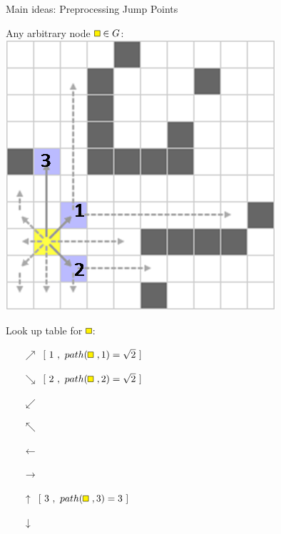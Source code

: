 \documentclass{presentation}
\begin{document}
\begin{frame}
\end{frame}



\begin{frame}{Main ideas: Preprocessing Jump Points}
	\begin{minipage}{0.45\textwidth}
		Any arbitrary node $\tikz{\path[draw=black,fill=yellow] (0,0) rectangle (2mm,2mm);}\in G$:\\
		\vspace{3mm}
		\includegraphics[width=\textwidth]{figures/jps_geschnitten/1(yellow).png}
	\end{minipage}%
	\hfill%
	\begin{minipage}{0.45\textwidth}
		Look up table for $\tikz{\path[draw=black,fill=yellow] (0,0) rectangle (2mm,2mm);}$:\\
		\vspace{3mm}
		\begin{itemize}
		\pause
		\item[$\nearrow$] $[\ 1\ ,\ path(\tikz{\path[draw=black,fill=yellow] (0,0) rectangle (2mm,2mm);}\ ,1)=\sqrt{2}\ ]$
		\pause
		\item[$\searrow$] $[\ 2\ ,\ path(\tikz{\path[draw=black,fill=yellow] (0,0) rectangle (2mm,2mm);}\ ,2)=\sqrt{2}\ ]$
		\item[$\swarrow$]
		\item[$\nwarrow$]
		\item[$\leftarrow$]
		\item[$\rightarrow$]
		\pause
		\item[$\uparrow$] $[\ 3\ ,\ path(\tikz{\path[draw=black,fill=yellow] (0,0) rectangle (2mm,2mm);}\ ,3)=3\ ]$
		\item[$\downarrow$]
		\end{itemize}
	\end{minipage}
\end{frame}
\end{document}
